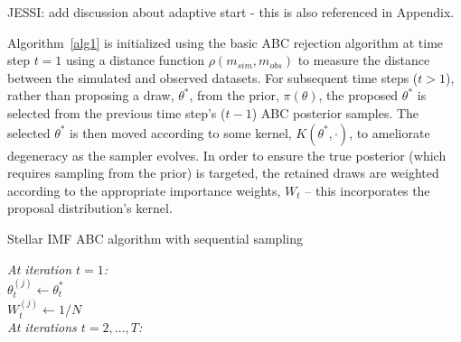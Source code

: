 \documentclass[12pt]{article}
\begin{document}
{\color{red} JESSI:  add discussion about adaptive start - this is also referenced in Appendix.}

Algorithm~\eqref{alg1} is initialized using the basic ABC rejection algorithm at time step $t = 1$ using a distance function $\rho(m_{sim}, m_{obs})$ to measure the distance between the simulated and observed datasets. For subsequent time steps ($t > 1$), rather than proposing a draw, $\theta^*$, from the prior, $\pi(\theta)$, the proposed $\theta^*$ is selected from the previous time step's ($t-1$) ABC posterior samples.  The selected $\theta^*$ is then moved according to some kernel, $K(\theta^*, \cdot)$, to ameliorate degeneracy as the sampler evolves.  In order to ensure the true posterior (which requires sampling from the prior) is targeted, the retained draws are weighted according to the appropriate importance weights, $W_t$ -- this incorporates the proposal distribution's kernel.


\begin{algorithm}[ht]
 \caption{Stellar IMF ABC algorithm with sequential sampling} \label{alg1}

 {\em At iteration $t = 1$:}\\
$\theta_t^{(j)} \gets \theta_t^*$\\
$W_t^{(j)} \gets 1/N$\\

{\em At iterations $t = 2, \ldots, T$:}\\
\end{algorithm}
\end{document}
